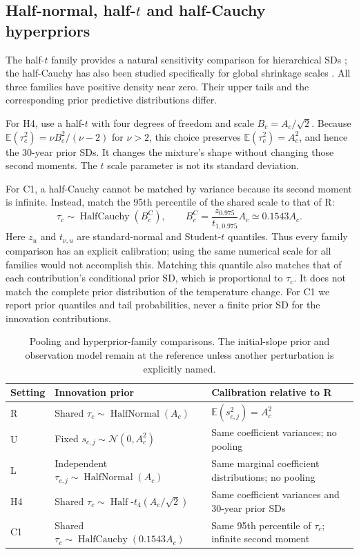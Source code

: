 \documentclass[11pt,a4paper]{article}
\newcommand{\E}{\mathbb E}
\newcommand{\N}{\mathcal N}
\begin{document}
\subsection{Half-normal, half-\texorpdfstring{\(t\)}{t} and half-Cauchy hyperpriors}
\label{supp:hyperprior-families}

The half-\(t\) family provides a natural sensitivity comparison for
hierarchical SDs \citep{gelman2006}; the half-Cauchy has also been
studied specifically for global shrinkage scales \citep{polson2012}.
All three families have positive density near zero. Their upper tails
and the corresponding prior predictive distributions differ.

For H4, use a half-\(t\) with four degrees of freedom and scale
\(B_c=A_c/\sqrt2\). Because
\(\E(\tau_c^2)=\nu B_c^2/(\nu-2)\) for \(\nu>2\), this choice
preserves \(\E(\tau_c^2)=A_c^2\), and hence the 30-year prior SDs.
It changes the mixture's shape without changing those second moments.
The \(t\) scale parameter is not its standard deviation.

For C1, a half-Cauchy cannot be matched by variance because its second
moment is infinite. Instead, match the 95th percentile of the shared
scale to that of R:
\begin{equation}\label{eq:supp-cauchy-calibration}
\tau_c\sim\operatorname{HalfCauchy}(B_c^{\mathrm C}),
\qquad
B_c^{\mathrm C}
=\frac{z_{0.975}}{t_{1,0.975}}A_c
\simeq0.1543A_c.
\end{equation}
Here \(z_u\) and \(t_{\nu,u}\) are standard-normal and Student-\(t\)
quantiles. Thus every family comparison has an explicit calibration;
using the same numerical scale for all families would not accomplish this.
Matching this quantile also matches that of each contribution's
conditional prior SD, which is proportional to \(\tau_c\). It does
not match the complete prior distribution of the temperature change.
For C1 we report prior quantiles and tail probabilities, never a finite
prior SD for the innovation contributions.

\begin{table}[!htbp]
\centering\small
\caption{Pooling and hyperprior-family comparisons. The initial-slope
prior and observation model remain at the reference unless another
perturbation is explicitly named.}
\label{tab:pooling-families}
\begin{tabularx}{\linewidth}{@{}lYY@{}}
\toprule
Setting & Innovation prior & Calibration relative to R \tabularnewline
\midrule
R & Shared \(\tau_c\sim\operatorname{HalfNormal}(A_c)\)
& \(\E(s_{c,j}^2)=A_c^2\) \tabularnewline
U & Fixed \(s_{c,j}\sim\N(0,A_c^2)\)
& Same coefficient variances; no pooling \tabularnewline
L & Independent \(\tau_{c,j}\sim\operatorname{HalfNormal}(A_c)\)
& Same marginal coefficient distributions; no pooling \tabularnewline
H4 & Shared \(\tau_c\sim\operatorname{Half}\text{-}t_4(A_c/\sqrt2)\)
& Same coefficient variances and 30-year prior SDs \tabularnewline
C1 & Shared \(\tau_c\sim\operatorname{HalfCauchy}(0.1543A_c)\)
& Same 95th percentile of \(\tau_c\); infinite second moment \tabularnewline
\bottomrule
\end{tabularx}
\end{table}
\end{document}
